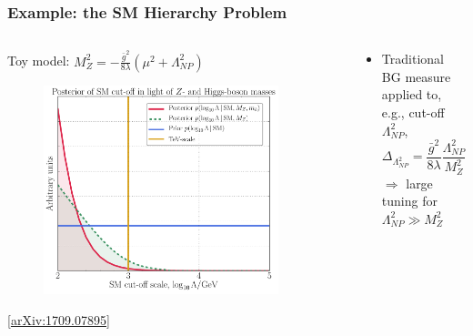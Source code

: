 \documentclass[10pt,aspectratio=169]{beamer}
\begin{document}
\begin{frame}
  \frametitle{Example: the SM Hierarchy Problem}
  \begin{columns}[t]
    \begin{column}{0.5\textwidth}
      \vspace{-15pt}
      \begin{center}
        Toy model: $M_Z^2 = -\frac{\bar{g}^2}{8 \lambda} (\mu^2
        + \Lambda_{NP}^2)$
      \end{center}
      \vspace{-10pt}
      \begin{figure}
        \includegraphics[width=0.9\textwidth]{SM_Lambda}
      \end{figure}
      \vspace{-20pt}
      \begin{center}
        \tiny
        [\href{http://arxiv.org/abs/1709.07895}{arXiv:1709.07895}]
      \end{center}
    \end{column}
    \begin{column}{0.5\textwidth}
      \begin{itemize} \itemsep1em
      \item Traditional BG measure applied to, e.g., cut-off $\Lambda_{NP}^2$,
        \begin{equation*}
          \Delta_{\Lambda_{NP}^2} = \frac{\bar{g}^2}{8 \lambda}
          \frac{\Lambda_{NP}^2}{M_Z^2}
        \end{equation*}
        $\Rightarrow$ large tuning for $\Lambda_{NP}^2 \gg M_Z^2$

\end{itemize}
\end{column}
\end{columns}
\end{frame}
\end{document}
